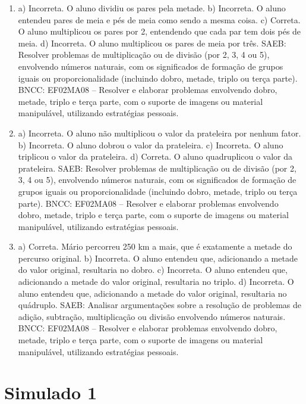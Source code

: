 \begin{enumerate}
\item
a) Incorreta. O aluno dividiu os pares pela metade.
b) Incorreta. O aluno entendeu pares de meia e pés de meia como sendo a
mesma coisa.
c) Correta. O aluno multiplicou os pares por 2, entendendo que cada par
tem dois pés de meia.
d) Incorreta. O aluno multiplicou os pares de meia por três.
SAEB: Resolver problemas de multiplicação ou de divisão (por 2,
3, 4 ou 5), envolvendo números naturais, com os significados de formação
de grupos iguais ou proporcionalidade (incluindo dobro, metade, triplo
ou terça parte).
BNCC: EF02MA08 -- Resolver e elaborar problemas envolvendo dobro, metade, triplo e terça parte,
com o suporte de imagens ou material manipulável, utilizando estratégias
pessoais.

\item
a) Incorreta. O aluno não multiplicou o valor da prateleira por nenhum fator.
b) Incorreta. O aluno dobrou o valor da prateleira.
c) Incorreta. O aluno triplicou o valor da prateleira.
d) Correta. O aluno quadruplicou o valor da prateleira.
SAEB: Resolver problemas de multiplicação ou de divisão (por 2,
3, 4 ou 5), envolvendo números naturais, com os significados de formação
de grupos iguais ou proporcionalidade (incluindo dobro, metade, triplo
ou terça parte).
BNCC: EF02MA08 -- Resolver e elaborar problemas envolvendo dobro, metade, triplo e terça parte,
com o suporte de imagens ou material manipulável, utilizando estratégias
pessoais.

\item
a) Correta. Mário percorreu 250 km a mais, que é exatamente a metade do percurso original.
b) Incorreta. O aluno entendeu que, adicionando a metade do valor original, resultaria no dobro.
c) Incorreta. O aluno entendeu que, adicionando a metade do valor original, resultaria no triplo.
d) Incorreta. O aluno entendeu que, adicionando a metade do valor original, resultaria no quádruplo.
SAEB: Analisar argumentações sobre a resolução de problemas de adição,
subtração, multiplicação ou divisão envolvendo números naturais.
BNCC: EF02MA08 -- Resolver e elaborar problemas envolvendo dobro, metade,
triplo e terça parte, com o suporte de imagens ou material manipulável, utilizando estratégias
pessoais.
\end{enumerate}

\section*{Simulado 1}

